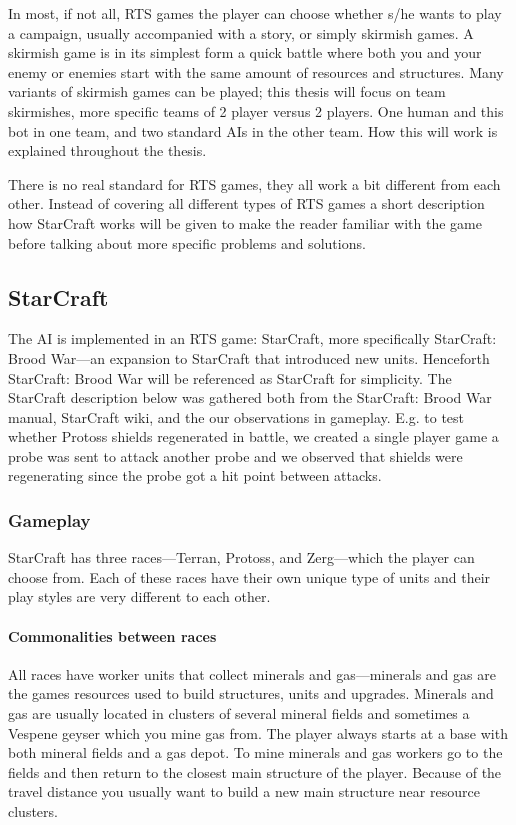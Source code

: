 In most, if not all, RTS games the player can choose whether s/he wants to play a campaign, usually accompanied with a story, or simply skirmish games. A skirmish game is in its simplest form a quick battle where both you and your enemy or enemies start with the same amount of resources and structures. Many variants of skirmish games can be played; this thesis will focus on team skirmishes, more specific teams of 2 player versus 2 players. One human and this bot in one team, and two standard AIs in the other team. How this will work is explained throughout the thesis.

There is no real standard for RTS games, they all work a bit different from each other. Instead of covering all different types of RTS games a short description how StarCraft works will be given to make the reader familiar with the game before talking about more specific problems and solutions.

\subsection{StarCraft}
The AI is implemented in an RTS game: StarCraft, more specifically StarCraft: Brood War—an expansion to StarCraft that introduced new units. Henceforth StarCraft: Brood War will be referenced as StarCraft for simplicity. The StarCraft description below was gathered both from the StarCraft: Brood War manual, StarCraft wiki, and the our observations in gameplay. E.g. to test whether Protoss shields regenerated in battle, we created a single player game a probe was sent to attack another probe and we observed that shields were regenerating since the probe got a hit point between attacks.




\subsubsection{Gameplay}
StarCraft has three races—Terran, Protoss, and Zerg—which the player can choose from. Each of these races have their own unique type of units and their play styles are very different to each other.

\paragraph{Commonalities between races}
All races have worker units that collect minerals and gas—minerals and gas are the games resources used to build structures, units and upgrades. Minerals and gas are usually located in clusters of several mineral fields and sometimes a Vespene geyser which you mine gas from. The player always starts at a base with both mineral fields and a gas depot. To mine minerals and gas workers go to the fields and then return to the closest main structure of the player. Because of the travel distance you usually want to build a new main structure near resource clusters.

